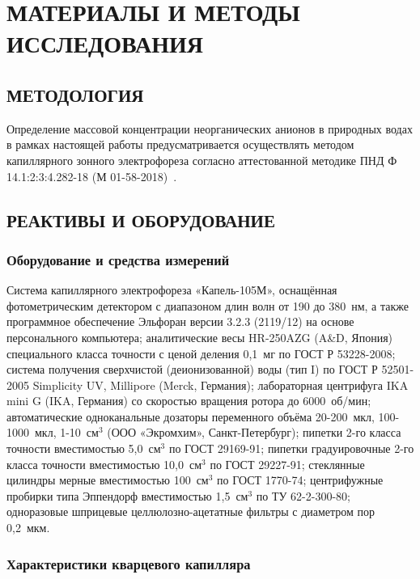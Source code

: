 \chapter{МАТЕРИАЛЫ И МЕТОДЫ ИССЛЕДОВАНИЯ}

\section{МЕТОДОЛОГИЯ}

Определение массовой концентрации неорганических анионов в природных водах в рамках настоящей работы предусматривается осуществлять методом капиллярного зонного электрофореза согласно аттестованной методике ПНД Ф 14.1:2:3:4.282-18 (М 01-58-2018)~\cite{pndf14123428218, shelekhovaOpredelenieAnionovNeorganicheskikh2023}.

\section{РЕАКТИВЫ И ОБОРУДОВАНИЕ}

\subsection{Оборудование и средства измерений}

Система капиллярного электрофореза «Капель-105М», оснащённая фотометрическим детектором с диапазоном длин волн от 190 до 380~нм, а также программное обеспечение Эльфоран версии 3.2.3 (2119/12) на основе персонального компьютера; аналитические весы HR-250AZG (A\&D, Япония) специального класса точности с ценой деления 0,1~мг по ГОСТ Р 53228-2008; система получения сверхчистой (деионизованной) воды (тип I) по ГОСТ Р 52501-2005 Simplicity UV, Millipore (Merck, Германия); лабораторная центрифуга IKA mini G (IKA, Германия) со скоростью вращения ротора до 6000~об/мин; автоматические одноканальные дозаторы переменного объёма 20-200~мкл, 100-1000~мкл, 1-10~см$^3$ (ООО «Экромхим», Санкт-Петербург); пипетки 2-го класса точности вместимостью 5,0~см$^3$ по ГОСТ 29169-91; пипетки градуировочные 2-го класса точности вместимостью 10,0~см$^3$ по ГОСТ 29227-91; стеклянные цилиндры мерные вместимостью 100~см$^3$ по ГОСТ 1770-74; центрифужные пробирки типа Эппендорф вместимостью 1,5~см$^3$ по ТУ 62-2-300-80; одноразовые шприцевые целлюлозно-ацетатные фильтры с диаметром пор 0,2~мкм.

\subsection{Характеристики кварцевого капилляра}


